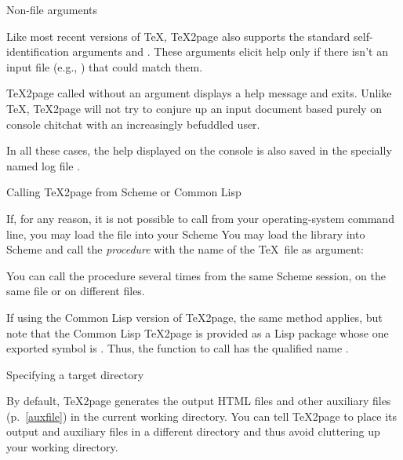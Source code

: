 \beginsection Non-file arguments

%
%
Like most recent versions of \TeX, \TeX2page also
supports the standard self-identification
arguments  and .  These
arguments elicit help only if there isn't an input file
(e.g., ) that could match them.

\TeX2page called without an argument displays a help
message and exits.  Unlike \TeX, \TeX2page will not try
to conjure up an input document based purely on console
chitchat with an increasingly befuddled user.

In all these cases, the help displayed on the console
is also saved in the specially named log file
.

\beginsection Calling \TeX2page from Scheme or Common Lisp

%
\ifx\inpltdist\Undefined
If, for any reason, it is not possible to call 
from your operating-system command line, you may load the
file  into your Scheme
\else
You may load the
library  into Scheme
\fi and call the
{\em procedure}  with the name of the \TeX\ file
as argument:

\ifx\inpltdist\Undefined
{}
\else
{}
\fi

\n You can call the procedure
 several times from the same Scheme
session, on the same file or on different files.

If using the Common Lisp version of \TeX2page, the same method applies,
but note that the Common Lisp \TeX2page is provided as a Lisp package
 whose one exported symbol is .  Thus, the
function to call has the qualified name .


\beginsection Specifying a target directory

%
By default, \TeX2page generates the output HTML files
and other auxiliary files (p.~\ref{auxfile}) in the
current working directory.  You can tell \TeX2page
to place its output and auxiliary files in a different
directory and thus avoid cluttering up your working
directory.

